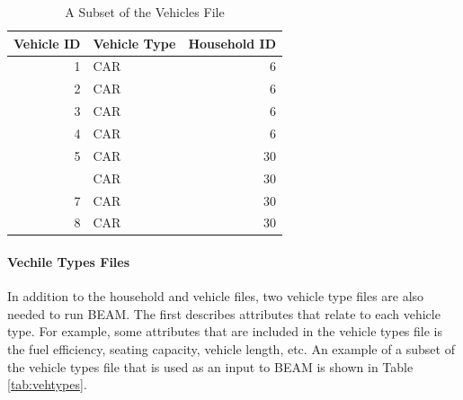 \documentclass[3p, authoryear, review]{elsarticle} %
\begin{document}
\begin{table}

\caption{\label{tab:veh}A Subset of the Vehicles File}
\centering
\begin{tabular}[t]{rlr}
\toprule
Vehicle ID & Vehicle Type & Household ID\\
\midrule
1 & CAR & 6\\
2 & CAR & 6\\
3 & CAR & 6\\
4 & CAR & 6\\
5 & CAR & 30\\
\addlinespace
6 & CAR & 30\\
7 & CAR & 30\\
8 & CAR & 30\\
\bottomrule
\end{tabular}
\end{table}

\hypertarget{vechile-types-files}{%
\paragraph{Vechile Types Files}\label{vechile-types-files}}

In addition to the household and vehicle files, two vehicle type files are also needed to run BEAM. The first describes attributes that relate to each vehicle type. For example, some attributes that are included in the vehicle types file is the fuel efficiency, seating capacity, vehicle length, etc. An example of a subset of the vehicle types file that is used as an input to BEAM is shown in Table \ref{tab:vehtypes}.
\end{document}
